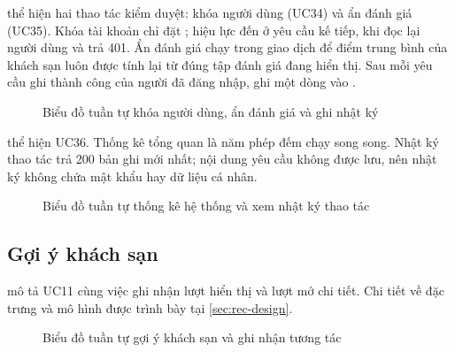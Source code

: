  thể hiện hai thao tác kiểm duyệt: khóa người dùng (UC34) và ẩn đánh giá (UC35). Khóa tài khoản chỉ đặt ; hiệu lực đến ở yêu cầu kế tiếp, khi  đọc lại người dùng và trả 401. Ẩn đánh giá chạy trong giao dịch để điểm trung bình của khách sạn luôn được tính lại từ đúng tập đánh giá đang hiển thị. Sau mỗi yêu cầu ghi thành công của người đã đăng nhập,  ghi một dòng vào .

\begin{figure}[H]
\centering
{}
\caption{Biểu đồ tuần tự khóa người dùng, ẩn đánh giá và ghi nhật ký}\label{fig:seq-admin-moderate}
\end{figure}

 thể hiện UC36. Thống kê tổng quan là năm phép đếm chạy song song. Nhật ký thao tác trả 200 bản ghi mới nhất; nội dung yêu cầu không được lưu, nên nhật ký không chứa mật khẩu hay dữ liệu cá nhân.

\begin{figure}[H]
\centering
{}
\caption{Biểu đồ tuần tự thống kê hệ thống và xem nhật ký thao tác}\label{fig:seq-admin-stats}
\end{figure}

\subsection{Gợi ý khách sạn}

 mô tả UC11 cùng việc ghi nhận lượt hiển thị và lượt mở chi tiết. Chi tiết về đặc trưng và mô hình được trình bày tại \cref{sec:rec-design}.

\begin{figure}[H]
\centering
{}
\caption{Biểu đồ tuần tự gợi ý khách sạn và ghi nhận tương tác}\label{fig:seq-rec}
\end{figure}
